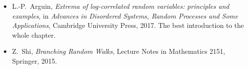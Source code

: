 \begin{itemize}
K.~Soundararajan, ``Maximum of the Riemann zeta function on a short interval of the critical line'', \emph{Communications on Pure and Applied Mathematics} 72 (2019), 500--535. L.-P.~Arguin, P.~Bourgade and M.~Radziwi\l\l, ``The
Fyodorov--Hiary--Keating conjecture. I'' (2020) and ``II'' (2023), preprints.
\item L.-P.~Arguin, \emph{Extrema of log-correlated random variables: principles and examples}, in \emph{Advances in Disordered Systems, Random Processes and Some Applications}, Cambridge University Press, 2017. The best introduction to the
whole chapter.
\item Z.~Shi, \emph{Branching Random Walks}, Lecture Notes in Mathematics 2151, Springer, 2015.
\end{itemize}
